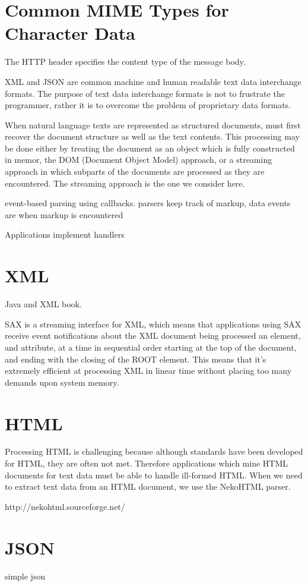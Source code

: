 \section{Common MIME Types for Character Data}

The HTTP  header specifies the content type of the message body.

XML and JSON are common machine and human readable text data interchange formats. 
The purpose of text data interchange formats is not to frustrate the programmer,
rather it is to overcome the problem of proprietary data formats.

When natural language texts are represented as structured documents,
must first recover the document structure as well as the text contents.
This processing may be done either by treating the document as an object
which is fully constructed in memor, the DOM (Document Object Model) approach,
or a streaming approach in which subparts of the documents are processed as
they are encountered.  The streaming approach is the one we consider here.

event-based parsing using callbacks.
parsers keep track of markup, data
events are when markup is encountered

Applications implement handlers 


\section{XML}

Java and XML book.

SAX is a streaming interface for XML, which means that applications using SAX receive event notifications about the XML document being processed an element, and attribute, at a time in sequential order starting at the top of the document, and ending with the closing of the ROOT element. This means that it’s extremely efficient at processing XML in linear time without placing too many demands upon system memory.

\section{HTML}

Processing HTML is challenging because although standards
have been developed for HTML, they are often not met.
Therefore applications which mine HTML documents for text data
must be able to handle ill-formed HTML.
When we need to extract text data from an HTML document,
we use the NekoHTML parser.

http://nekohtml.sourceforge.net/




\section{JSON}

simple json


